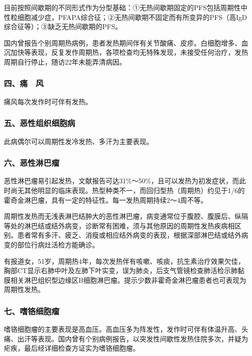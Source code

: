 目前按照间歇期的不同形式作为分型基础：①无热间歇期固定的PFS包括周期性中性粒细胞减少症，PFAPA综合征；②无热间歇期不固定而有所变异的PFS（高IgD综合征等）；③缺乏无热间歇期的PFS。

国内曾报告个别周期热病例，患者发热期间伴有关节酸痛、皮疹。白细胞增多、血沉加快等表现，反复发作周期热，各项检查均无特殊发现，未接受任何治疗，发热周期自行停止，随访22年未能弄清病因。

\subsubsection{四、痛　风}

痛风每次发作时可伴有发热。

\subsubsection{五、恶性组织细胞病}

此病偶尔可以周期性发冷发热、多汗为主要表现。

\subsubsection{六、恶性淋巴瘤}

恶性淋巴瘤易引起发热，文献报告可达31\%～50\%，且可以发热为初发症状，而此时尚无其他明显的临床表现。热型种类不一，而回归型热（周期热）约见于1/6的霍奇金淋巴瘤，具有一定的特征性。每一发热周期持续2～4周不等。

周期性发热而无浅表淋巴结肿大的恶性淋巴瘤，病变通常位于腹腔、腹膜后、纵隔等处的淋巴结或结外病变，诊断常有困难，须与其他原因的周期性发热疾病相区别。患者常有多汗、疲乏、消瘦或相应结外病变的表现，根据深部淋巴结或结外病变的部位行病灶活检方能确诊。

有报道女，51岁，周期热4年，每次发热伴有咳嗽、咳痰，抗生素治疗效果欠佳，胸部CT显示右肺中叶及左肺下叶实变，误为肺炎，后支气管镜检查肺活检示肺黏膜相关淋巴组织型边缘区B细胞淋巴瘤。提示少数非霍奇金淋巴瘤患者也可表现为周期性发热。

\subsubsection{七、嗜铬细胞瘤}

嗜铬细胞瘤的主要表现是高血压。高血压多为阵发性，发作时可伴有体温升高、头痛、出汗等表现。国内曾有个别病例报告，以突发性间歇性发热住院多次，并疑为疟疾，最后经详细检查方证实为嗜铬细胞瘤。

\protect\hypertarget{text00032.html}{}{}


